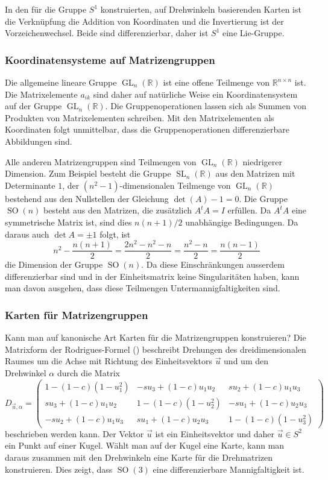 In den für die Gruppe $S^1$ konstruierten, auf Drehwinkeln basierenden
Karten ist die Verknüpfung die
Addition von Koordinaten und die Invertierung ist der Vorzeichenwechsel.
Beide sind differenzierbar, daher ist $S^1$ eine Lie-Gruppe.

%
%
\subsubsection{Koordinatensysteme auf Matrizengruppen}
Die allgemeine lineare Gruppe $\operatorname{GL}_n(\mathbb{R})$
ist eine offene Teilmenge von $\mathbb{R}^{n\times n}$ ist.
Die Matrixelemente $a_{ik}$ sind daher auf natürliche Weise ein
Koordinatensystem auf der Gruppe $\operatorname{GL}_n(\mathbb{R})$.
Die Gruppenoperationen lassen sich als Summen von Produkten von
Matrixelementen schreiben.
Mit den Matrixelementen als Koordinaten folgt unmittelbar, dass
die Gruppenoperationen differenzierbare Abbildungen sind.

Alle anderen Matrizengruppen sind Teilmengen von
$\operatorname{GL}_n(\mathbb{R})$ niedrigerer Dimension.
Zum Beispiel besteht die Gruppe $\operatorname{SL}_n(\mathbb{R})$
aus den Matrizen mit Determinante $1$, der $(n^2-1)$-dimensionalen
Teilmenge von $\operatorname{GL}_n(\mathbb{R})$ bestehend aus
den Nullstellen der Gleichung $\det(A)-1=0$.
Die Gruppe $\operatorname{SO}(n)$ besteht aus den Matrizen, die
zusätzlich $A^tA=I$ erfüllen.
Da $A^tA$ eine symmetrische Matrix ist, sind dies
$n(n+1)/2$ unabhängige Bedingungen.
Da daraus auch $\det A=\pm1$ folgt, ist
\[
n^2 - \frac{n(n+1)}2
=
\frac{2n^2-n^2-n}{2}
=
\frac{n^2-n}2
=
\frac{n(n-1)}2
\]
die Dimension der Gruppe $\operatorname{SO}(n)$.
Da diese Einschränkungen ausserdem differenzierbar sind und in der
Einheitsmatrix keine Singularitäten haben, kann man davon ausgehen,
dass diese Teilmengen Untermannigfaltigkeiten sind.

%
%
\subsubsection{Karten für Matrizengruppen}
Kann man auf kanonische Art Karten für die Matrizengruppen
konstruieren?
Die Matrixform der Rodrigues-Formel (\cite[p.~438]{buch:linalg})
beschreibt Drehungen des dreidimensionalen Raumes um die Achse mit
Richtung des Einheitsvektors $\vec{u}$ und um den Drehwinkel $\alpha$
durch die Matrix
\[
D_{\vec{u},\alpha}
=
\begin{pmatrix}
 1-(1-c)(1-u_1^2) & -su_3+(1-c)u_1u_2 &  su_2+(1-c)u_1u_3 \\
 su_3+(1-c)u_1u_2 &  1-(1-c)(1-u_2^2) & -su_1+(1-c)u_2u_3 \\
-su_2+(1-c)u_1u_3 &  su_1+(1-c)u_2u_3 &  1-(1-c)(1-u_3^2) 
\end{pmatrix}
\]
beschrieben werden kann.
Der Vektor $\vec{u}$ ist ein Einheitsvektor und daher $\vec{u}\in S^2$
ein Punkt auf einer Kugel.
Wählt man auf der Kugel eine Karte, kann man daraus zusammen mit den
Drehwinkeln eine Karte für die Drehmatrizen konstruieren.
Dies zeigt, dass $\operatorname{SO}(3)$ eine differenzierbare
Mannigfaltigkeit ist.

